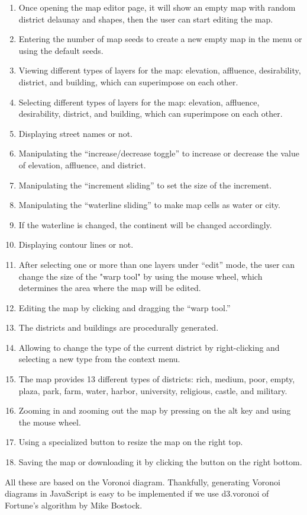\begin{enumerate}
  \item Once opening the map editor page, it will show an empty map with random district delaunay and shapes, then the user can start editing the map.
  \item Entering the number of map seeds to create a new empty map in the menu or using the default seeds.
  \item Viewing different types of layers for the map: elevation, affluence, desirability, district, and building, which can superimpose on each other.
  \item Selecting different types of layers for the map: elevation, affluence, desirability, district, and building, which can superimpose on each other.
  \item Displaying street names or not.
  \item Manipulating the ``increase/decrease toggle'' to increase or decrease the value of elevation, affluence, and district.
  \item Manipulating the ``increment sliding'' to set the size of the increment.
  \item Manipulating the ``waterline sliding'' to make map cells as water or city.
  \item If the waterline is changed, the continent will be changed accordingly.
  \item Displaying contour lines or not.
  \item After selecting one or more than one layers under ``edit'' mode, the user can change the size of the "warp tool" by using the mouse wheel, which determines the area where the map will be edited.
  \item Editing the map by clicking and dragging the ``warp tool.''
  \item The districts and buildings are procedurally generated.
  \item Allowing to change the type of the current district by right-clicking and selecting a new type from the context menu.
  \item The map provides 13 different types of districts: rich, medium, poor, empty, plaza, park, farm, water, harbor, university, religious, castle, and military.
  \item Zooming in and zooming out the map by pressing on the alt key and using the mouse wheel.
  \item Using a specialized button to resize the map on the right top.
  \item Saving the map or downloading it by clicking the button on the right bottom.
\end{enumerate}

All these are based on the Voronoi diagram. Thankfully, generating Voronoi diagrams in JavaScript is easy to be implemented if we use d3.voronoi of Fortune’s algorithm by Mike Bostock.
